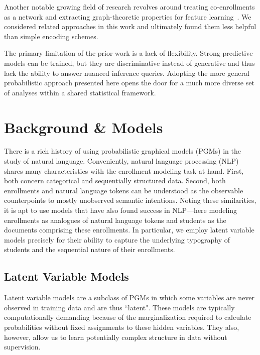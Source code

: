 \documentclass{edm_template}
\begin{document}
Another notable growing field of research revolves around treating co-enrollments as a network and extracting graph-theoretic properties for feature learning~\cite{gardner2018coenrollment}\cite{Wang2017AnalyzingCC}. We considered related approaches in this work and ultimately found them less helpful than simple encoding schemes.

The primary limitation of the prior work is a lack of flexibility. Strong predictive models can be trained, but they are discriminative instead of generative and thus lack the ability to answer nuanced inference queries. Adopting the more general probabilistic approach presented here opens the door for a much more diverse set of analyses within a shared statistical framework.

\section{Background \& Models}

There is a rich history of using probabilistic graphical models (PGMs) in the study of natural language. Conveniently, natural language processing (NLP) shares many characteristics with the enrollment modeling task at hand. First, both concern categorical and sequentially structured data. Second, both enrollments and natural language tokens can be understood as the observable counterpoints to mostly unobserved semantic intentions. Noting these similarities, it is apt to use models that have also found success in NLP---here modeling enrollments as analogues of natural language tokens and students as the documents comprising these enrollments. In particular, we employ latent variable models precisely for their ability to capture the underlying typography of students and the sequential nature of their enrollments. 

\subsection{Latent Variable Models}
\label{section:latent-variable-models}

Latent variable models are a subclass of PGMs in which some variables are never observed in training data and are thus ``latent". These models are typically computationally demanding because of the marginalization required to calculate probabilities without fixed assignments to these hidden variables. They also, however, allow us to learn potentially complex structure in data without supervision. 
\end{document}

